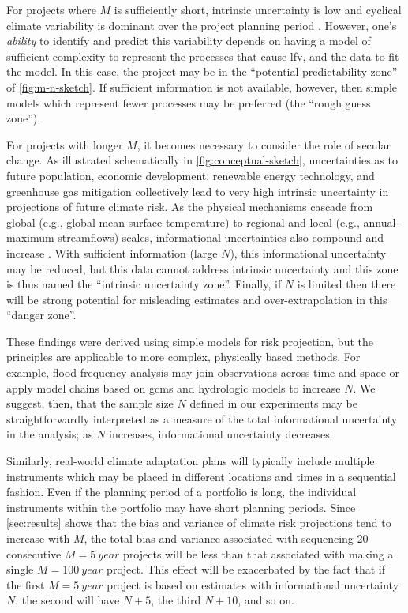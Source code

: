 \documentclass[
  draft,
  linenumbers
]{agujournal2018}
\makeatletter
\newcommand{\eg}{e.g.\@\xspace}
\makeatother
\begin{document}
For projects where $M$ is sufficiently short, intrinsic uncertainty is low and cyclical climate variability is dominant over the project planning period \citep{Jain:2001hz,Hodgkins:2017hw}.
However, one's \emph{ability} to identify and predict this variability depends on having a model of sufficient complexity to represent the processes that cause \gls{lfv}, and the data to fit the model.
In this case, the project may be in the ``potential predictability zone'' of \cref{fig:m-n-sketch}.
If sufficient information is not available, however, then simple models which represent fewer processes may be preferred (the ``rough guess zone'').

For projects with longer $M$, it becomes necessary to consider the role of secular change.
As illustrated schematically in \cref{fig:conceptual-sketch}, uncertainties as to future population, economic development, renewable energy technology, and greenhouse gas mitigation collectively lead to very high intrinsic uncertainty in projections of future climate risk.
As the physical mechanisms cascade from global (\eg, global mean surface temperature) to regional  \citep[\eg, storm track position][]{Barnes:2015gl} and local (\eg, annual-maximum streamflows) scales, informational uncertainties also compound and increase \citep{Dittes:2017he}.
With sufficient information (large $N$), this informational uncertainty may be reduced, but this data cannot address intrinsic uncertainty and this zone is thus named the ``intrinsic uncertainty zone''.
Finally, if $N$ is limited then there will be strong potential for misleading estimates and over-extrapolation in this ``danger zone''.

These findings were derived using simple models for risk projection, but the principles are applicable to more complex, physically based methods.
For example, flood frequency analysis may join observations across time and space \citep{Lima:2016kd,Merz:2008eh} or apply model chains based on \glspl{gcm} and hydrologic models \citep[see][]{Merz:2014gf} to increase $N$.
We suggest, then, that the sample size $N$ defined in our experiments may be straightforwardly interpreted as a measure of the total informational uncertainty in the analysis; as $N$ increases, informational uncertainty decreases.

Similarly, real-world climate adaptation plans will typically include multiple instruments which may be placed in different locations and times in a sequential fashion.
Even if the planning period of a portfolio is long, the individual instruments within the portfolio may have short planning periods.
Since \cref{sec:results} shows that the bias and variance of climate risk projections tend to increase with $M$, the total bias and variance associated with sequencing 20 consecutive $M=\SI{5}{year}$ projects will be less than that associated with making a single $M=\SI{100}{year}$ project.
This effect will be exacerbated by the fact that if the first $M=\SI{5}{year}$ project is based on estimates with informational uncertainty $N$, the second will have $N+5$, the third $N+10$, and so on.
\end{document}
